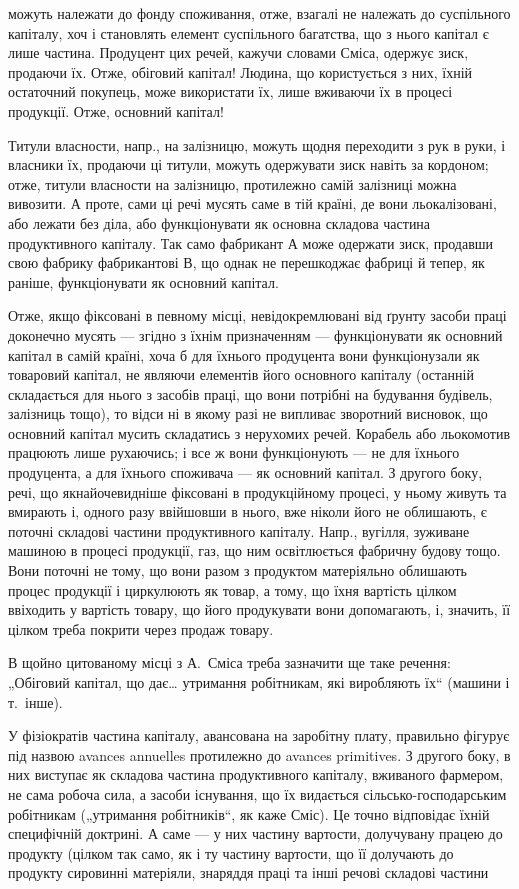 \parcont{}  %
можуть належати до фонду споживання, отже, взагалі не належать до
суспільного капіталу, хоч і становлять елемент суспільного багатства, що
з нього капітал є лише частина. Продуцент цих речей, кажучи словами
Сміса, одержує зиск, продаючи їх. Отже, обіговий капітал! Людина, що
користується з них, їхній остаточний покупець, може використати їх, лише
вживаючи їх в процесі продукції. Отже, основний капітал!

Титули власности, напр., на залізницю, можуть щодня переходити з
рук в руки, і власники їх, продаючи ці титули, можуть одержувати зиск
навіть за кордоном; отже, титули власности на залізницю, протилежно
самій залізниці можна вивозити. А проте, сами ці речі мусять саме в тій
країні, де вони льокалізовані, або лежати без діла, або функціонувати як
основна складова частина продуктивного капіталу. Так само фабрикант
$А$ може одержати зиск, продавши свою фабрику фабрикантові $В$, що однак
не перешкоджає фабриці й тепер, як раніше, функціонувати як основний
капітал.

Отже, якщо фіксовані в певному місці, невідокремлювані від ґрунту
засоби праці доконечно мусять — згідно з їхнім призначенням — функціонувати
як основний капітал в самій країні, хоча б для їхнього продуцента
вони функціонузали як товаровий капітал, не являючи елементів його
основного капіталу (останній складається для нього з засобів праці, що
вони потрібні на будування будівель, залізниць тощо), то відси ні в
якому разі не випливає зворотний висновок, що основний капітал мусить
складатись з нерухомих речей. Корабель або льокомотив працюють
лише рухаючись; і все ж вони функціонують — не для їхнього продуцента,
а для їхнього споживача — як основний капітал. З другого боку,
речі, що якнайочевидніше фіксовані в продукційному процесі, у ньому
живуть та вмирають і, одного разу ввійшовши в нього, вже ніколи його
не облишають, є поточні складові частини продуктивного капіталу. Напр.,
вугілля, зуживане машиною в процесі продукції, газ, що ним освітлюється
фабричну будову тощо. Вони поточні не тому, що вони разом з
продуктом матеріяльно облишають процес продукції і циркулюють як
товар, а тому, що їхня вартість цілком ввіходить у вартість товару, що
його продукувати вони допомагають, і, значить, її цілком треба покрити
через продаж товару.

В щойно цитованому місці з А.~Сміса треба зазначити ще таке речення:
„Обіговий капітал, що дає\dots{} утримання робітникам, які виробляють
їх“ (машини і т.~інше).

У фізіократів частина капіталу, авансована на заробітну плату, правильно
фігурує під назвою avances annuelles протилежно до avances primitives.
З другого боку, в них виступає як складова частина продуктивного
капіталу, вживаного фармером, не сама робоча сила, а засоби існування,
що їх видається сільсько-господарським робітникам („утримання
робітників“, як каже Сміс). Це точно відповідає їхній специфічній доктрині.
А саме — у них частину вартости, долучувану працею до продукту
(цілком так само, як і ту частину вартости, що її долучають до продукту
сировинні матеріяли, знаряддя праці та інші речові складові частини
\parbreak{}  %
